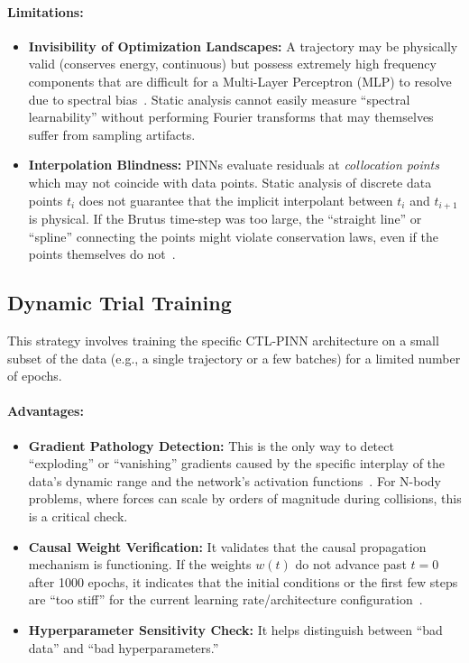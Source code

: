 \paragraph{Limitations:}
\begin{itemize}
    \item \textbf{Invisibility of Optimization Landscapes:} A trajectory may be physically valid (conserves energy, continuous) but possess extremely high frequency components that are difficult for a Multi-Layer Perceptron (MLP) to resolve due to spectral bias~\cite{ref8}. Static analysis cannot easily measure ``spectral learnability'' without performing Fourier transforms that may themselves suffer from sampling artifacts.
    \item \textbf{Interpolation Blindness:} PINNs evaluate residuals at \textit{collocation points} which may not coincide with data points. Static analysis of discrete data points $t_i$ does not guarantee that the implicit interpolant between $t_i$ and $t_{i+1}$ is physical. If the Brutus time-step was too large, the ``straight line'' or ``spline'' connecting the points might violate conservation laws, even if the points themselves do not~\cite{ref16}.
\end{itemize}

\subsection{Dynamic Trial Training}

This strategy involves training the specific CTL-PINN architecture on a small subset of the data (e.g., a single trajectory or a few batches) for a limited number of epochs.

\paragraph{Advantages:}
\begin{itemize}
    \item \textbf{Gradient Pathology Detection:} This is the only way to detect ``exploding'' or ``vanishing'' gradients caused by the specific interplay of the data's dynamic range and the network's activation functions~\cite{ref14}. For N-body problems, where forces can scale by orders of magnitude during collisions, this is a critical check.
    \item \textbf{Causal Weight Verification:} It validates that the causal propagation mechanism is functioning. If the weights $w(t)$ do not advance past $t=0$ after 1000 epochs, it indicates that the initial conditions or the first few steps are ``too stiff'' for the current learning rate/architecture configuration~\cite{ref10}.
    \item \textbf{Hyperparameter Sensitivity Check:} It helps distinguish between ``bad data'' and ``bad hyperparameters.''
\end{itemize}

